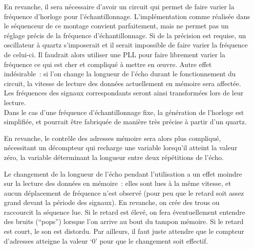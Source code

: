 \documentclass{article}
\begin{document}
En revanche, il sera nécessaire d'avoir un circuit qui permet de faire varier la fréquence d'horloge pour l'échantillonnage. L'implémentation comme réalisée dans le séquenceur de ce montage convient parfaitement, mais ne permet pas un réglage précis de la fréquence d'échantillonnage. Si de la précision est requise, un oscillateur à quartz s'imposerait et il serait impossible de faire varier la fréquence de celui-ci. Il faudrait alors utiliser une PLL pour faire librement varier la fréquence ce qui est cher et compliqué à mettre en œuvre.
\texttt{}
Autre effet indésirable~: si l'on change la longueur de l'écho durant le fonctionnement du circuit, la vitesse de lecture des données actuellement en mémoire sera affectée. Les fréquences des signaux correspondants seront ainsi transformées lors de leur lecture.
\\

Dans le cas d'une fréquence d'échantillonnage fixe, la génération de l'horloge est simplifiée, et pourrait être fabriquée de manière très précise à partir d'un quartz.

En revanche, le contrôle des adresses mémoire sera alors plus compliqué, nécessitant un décompteur qui recharge une variable lorsqu'il atteint la valeur zéro, la variable déterminant la longueur entre deux répétitions de l'écho.

Le changement de la longueur de l'écho pendant l'utilisation a un effet moindre sur la lecture des données en mémoire~: elles sont lues à la même vitesse, et aucun déplacement de fréquence n'est observé (pour peu que le retard soit assez grand devant la période des signaux). En revanche, on crée des trous ou raccourcit la séquence lue. Si le retard est élevé, on fera éventuellement entendre des bruits (``pops'') lorsque l'on arrive au bout du tampon mémoire. Si le retard est court, le son est distordu.
Par ailleurs, il faut juste attendre que le compteur d'adresses atteigne la valeur `0' pour que le changement soit effectif.


\end{document}
